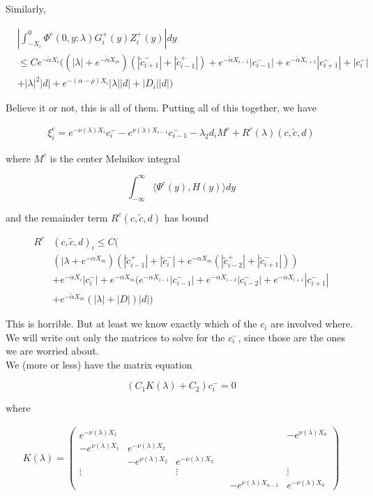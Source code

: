 \documentclass[12pt]{article}
\begin{document}
\begin{enumerate}
Similarly,

\begin{align*}
&\left| \int_{-X_i}^0 \Phi^c(0, y; \lambda) G_i^+(y)Z_i^+(y) \right| dy \\ 
&\leq C e^{-\tilde{\alpha} X_i} ( (|\lambda| + e^{-\tilde{\alpha}X_m})(|\tilde{c}_{i+1}^-| + |\tilde{c}_{i-1}^+|) + e^{-\tilde{\alpha} X_{i-1}} |c_{i-1}^-| + e^{-\tilde{\alpha} X_{i+1}} |c_{i+1}^-| + |c_i^-| \\
&+ |\lambda|^2 |d| + e^{-(\alpha - \rho)X_i}|\lambda||d| + |D_i||d| )
\end{align*}

\end{enumerate}

Believe it or not, this is all of them. Putting all of this together, we have

\begin{align*}
\xi^c_i = e^{-\nu(\lambda) X_i} c_i^- - e^{\nu(\lambda) X_{i-1}} c_{i-1}^- - \lambda_2 d_i M^c + R^c(\lambda)(c, \tilde{c}, d)
\end{align*}

where $M^c$ is the center Melnikov integral

\[
\int_{-\infty}^\infty \langle \Psi^c(y), H(y) \rangle dy 
\]

and the remainder term $R^c(c, \tilde{c}, d)$ has bound

\begin{align*}
R^c&(c, \tilde{c}, d)_i \leq C \Big( \\
&(|\lambda + e^{-\alpha X_m})(|\tilde{c}_{i-1}^+| + |\tilde{c}_{i}^-| + e^{-\alpha X_m}( |\tilde{c}_{i-2}^+| + |\tilde{c}_{i+1}^-|) ) \\
&+ e^{-\alpha X_i} |c_i^-| + e^{-\alpha X_m}( e^{-\alpha X_{i-1}} |c_{i-1}^-| + e^{-\alpha X_{i-2}} |c_{i-2}^-| + e^{-\alpha X_{i+1}} |c_{i+1}^-| \\
&+ e^{-\tilde{\alpha} X_m} (|\lambda| + |D|)|d|
\Big)
\end{align*}

This is horrible. But at least we know exactly which of the $c_i$ are involved where. We will write out only the matrices to solve for the $c_i^-$, since those are the ones we are worried about.\\

We (more or less) have the matrix equation

\[
(C_1 K(\lambda)+ C_2) c_i^- = 0
\]

where

\begin{align*}
K(\lambda) =  
\begin{pmatrix}
e^{-\nu(\lambda)X_1} & & & & & -e^{\nu(\lambda)X_0} \\
-e^{\nu(\lambda)X_1} & e^{-\nu(\lambda)X_2} \\
& -e^{\nu(\lambda)X_2} & e^{-\nu(\lambda)X_3} \\
\vdots & & \vdots & &&  \vdots \\
& & & & -e^{\nu(\lambda)X_{n-1}} & e^{-\nu(\lambda)X_0} 
\end{pmatrix}
\end{align*}
\end{document}
